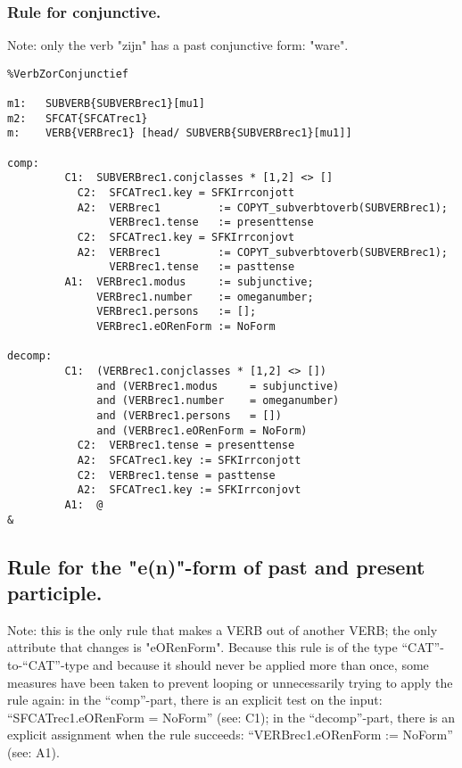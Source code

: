 \subsubsection{Rule for conjunctive.}

Note: only the verb "zijn" has a past conjunctive form: "ware". 

\begin{verbatim}
%VerbZorConjunctief

m1:   SUBVERB{SUBVERBrec1}[mu1]
m2:   SFCAT{SFCATrec1}
m:    VERB{VERBrec1} [head/ SUBVERB{SUBVERBrec1}[mu1]]

comp:
         C1:  SUBVERBrec1.conjclasses * [1,2] <> []
           C2:  SFCATrec1.key = SFKIrrconjott
           A2:  VERBrec1         := COPYT_subverbtoverb(SUBVERBrec1);
                VERBrec1.tense   := presenttense
           C2:  SFCATrec1.key = SFKIrrconjovt
           A2:  VERBrec1         := COPYT_subverbtoverb(SUBVERBrec1);
                VERBrec1.tense   := pasttense
         A1:  VERBrec1.modus     := subjunctive;
              VERBrec1.number    := omeganumber;
              VERBrec1.persons   := [];
              VERBrec1.eORenForm := NoForm

decomp:
         C1:  (VERBrec1.conjclasses * [1,2] <> [])
              and (VERBrec1.modus     = subjunctive)
              and (VERBrec1.number    = omeganumber)
              and (VERBrec1.persons   = [])
              and (VERBrec1.eORenForm = NoForm) 
           C2:  VERBrec1.tense = presenttense 
           A2:  SFCATrec1.key := SFKIrrconjott
           C2:  VERBrec1.tense = pasttense
           A2:  SFCATrec1.key := SFKIrrconjovt
         A1:  @
&
\end{verbatim}
\newpage
\subsection{Rule for the "e(n)"-form of past and present participle.}

Note: this is the only rule that makes a VERB out of another VERB; the only
attribute that changes is "eORenForm".
Because this rule is of the type ``CAT''-to-``CAT''-type and because it should 
never be applied more than once, some measures have
been taken to prevent looping or unnecessarily trying to apply the rule again:
in the ``comp''-part, there is an explicit test on the input: 
``SFCATrec1.eORenForm = NoForm'' (see: C1); in the ``decomp''-part, there is an 
explicit assignment when the rule succeeds: ``VERBrec1.eORenForm := NoForm''
(see: A1).

